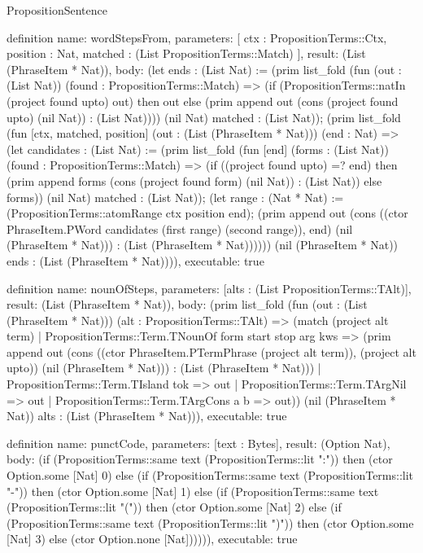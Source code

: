 \begin{lexlean}{PropositionSentence}
\begin{semanticmodule}
definition{
  name: wordStepsFrom,
  parameters: [
    ctx : PropositionTerms::Ctx,
    position : Nat,
    matched : (List PropositionTerms::Match)
  ],
  result: (List (PhraseItem * Nat)),
  body: (let ends : (List Nat) := (prim list_fold (fun (out : (List Nat)) (found : PropositionTerms::Match) => (if (PropositionTerms::natIn (project found upto) out) then out else (prim append out (cons (project found upto) (nil Nat)) : (List Nat)))) (nil Nat) matched : (List Nat)); (prim list_fold (fun [ctx, matched, position] (out : (List (PhraseItem * Nat))) (end : Nat) => (let candidates : (List Nat) := (prim list_fold (fun [end] (forms : (List Nat)) (found : PropositionTerms::Match) => (if ((project found upto) =? end) then (prim append forms (cons (project found form) (nil Nat)) : (List Nat)) else forms)) (nil Nat) matched : (List Nat)); (let range : (Nat * Nat) := (PropositionTerms::atomRange ctx position end); (prim append out (cons ((ctor PhraseItem.PWord candidates (first range) (second range)), end) (nil (PhraseItem * Nat))) : (List (PhraseItem * Nat)))))) (nil (PhraseItem * Nat)) ends : (List (PhraseItem * Nat)))),
  executable: true
}

definition{
  name: nounOfSteps,
  parameters: [alts : (List PropositionTerms::TAlt)],
  result: (List (PhraseItem * Nat)),
  body: (prim list_fold (fun (out : (List (PhraseItem * Nat))) (alt : PropositionTerms::TAlt) => (match (project alt term)
    | PropositionTerms::Term.TNounOf form start stop arg kws => (prim append out (cons ((ctor PhraseItem.PTermPhrase (project alt term)), (project alt upto)) (nil (PhraseItem * Nat))) : (List (PhraseItem * Nat)))
    | PropositionTerms::Term.TIsland tok => out
    | PropositionTerms::Term.TArgNil => out
    | PropositionTerms::Term.TArgCons a b => out)) (nil (PhraseItem * Nat)) alts : (List (PhraseItem * Nat))),
  executable: true
}

definition{
  name: punctCode,
  parameters: [text : Bytes],
  result: (Option Nat),
  body: (if (PropositionTerms::same text (PropositionTerms::lit ":")) then (ctor Option.some [Nat] 0) else (if (PropositionTerms::same text (PropositionTerms::lit "-")) then (ctor Option.some [Nat] 1) else (if (PropositionTerms::same text (PropositionTerms::lit "(")) then (ctor Option.some [Nat] 2) else (if (PropositionTerms::same text (PropositionTerms::lit ")")) then (ctor Option.some [Nat] 3) else (ctor Option.none [Nat]))))),
  executable: true
}


\end{semanticmodule}
\end{lexlean}

